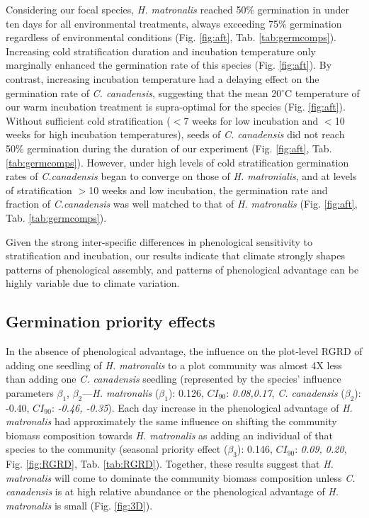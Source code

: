 \documentclass{article}[11pt]
\begin{document}
Considering our focal species, \textit{H. matronalis} reached 50\% germination in under ten days for all environmental treatments, always exceeding 75\% germination regardless of environmental conditions (Fig. \ref{fig:aft}, Tab. \ref{tab:germcomps}). Increasing cold stratification duration and incubation temperature only marginally enhanced the germination rate of this species (Fig. \ref{fig:aft}). By contrast, increasing incubation temperature had a delaying effect on the germination rate of \textit{C. canadensis}, suggesting that the mean 20$^{\circ}$C temperature of our warm incubation treatment is supra-optimal for the species (Fig. \ref{fig:aft}). Without sufficient cold stratification ($<$7 weeks for low incubation and $<$10 weeks for high incubation temperatures), seeds of  \textit{C. canadensis} did not reach 50\% germination during the duration of our experiment (Fig. \ref{fig:aft}, Tab. \ref{tab:germcomps}). However, under high levels of cold stratification germination rates of \textit{C.canadensis} began to converge on those of \textit{H. matronialis}, and at levels of stratification $>$10 weeks and low incubation, the germination rate and fraction of \textit{C.canadensis} was well matched to that of \textit{H. matronalis} (Fig. \ref{fig:aft}, Tab. \ref{tab:germcomps}).

Given the strong inter-specific differences in phenological sensitivity to stratification and incubation, our results indicate that climate strongly shapes patterns of phenological assembly, and patterns of phenological advantage can be highly variable due to climate variation.

\subsection*{Germination priority effects}
In the absence of phenological advantage, the influence on the plot-level RGRD of adding one seedling of \textit{H. matronalis} to a plot community was almost 4X less than adding one \textit{C. canadensis} seedling (represented by the species' influence parameters $\beta_{1}$, $\beta_{2}$---\textit{H. matronalis} ($\beta_{1}$): 0.126, $CI_{90}$: \textit{0.08,0.17}, \textit{C. canadensis} ($\beta_{2}$): -0.40, $CI_{90}$: \textit{-0.46, -0.35}). Each day increase in the phenological advantage of \textit{ H. matronalis} had approximately the same influence on shifting the community biomass composition towards \textit{H. matronalis} as adding an individual of that species to the community (seasonal priority effect ($\beta_{3}$): 0.146, $CI_{90}$: \textit{0.09, 0.20}, Fig. \ref{fig:RGRD}, Tab. \ref{tab:RGRD}). Together, these results suggest that \textit{H. matronalis} will come to dominate the community biomass composition unless \textit{C. canadensis} is at high relative abundance or the phenological advantage of \textit{H. matronalis} is small (Fig. \ref{fig:3D}).
\end{document}
